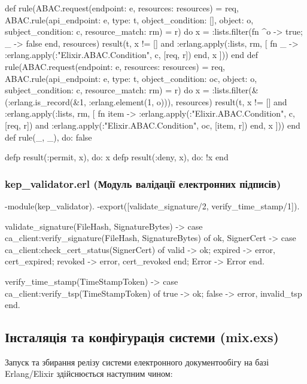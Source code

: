\documentclass{article}
\let\originalfootnotesize\footnotesize
\let\oldverbatim\verbatim
\let\oldendverbatim\endverbatim
\renewenvironment{verbatim}{\originalfootnotesize\oldverbatim}{\oldendverbatim}
\begin{document}
\begin{verbatim}
  def rule(ABAC.request(endpoint: e, resources: resources) = req,
    ABAC.rule(api_endpoint: e, type: t, object_condition: [], object: o,
    subject_condition: c, resource_match: rm) = r) do
    x = :lists.filter(fn ^o -> true; _ -> false end, resources)
    result(t, x != [] and :erlang.apply(:lists, rm, [
      fn _ -> :erlang.apply(:"Elixir.ABAC.Condition", c, [req, r]) end,
      x
    ]))
  end
  def rule(ABAC.request(endpoint: e, resources: resources) = req,
    ABAC.rule(api_endpoint: e, type: t, object_condition: oc, object: o,
    subject_condition: c, resource_match: rm) = r) do
    x = :lists.filter(&(:erlang.is_record(&1, :erlang.element(1, o))), resources)
    result(t, x != [] and :erlang.apply(:lists, rm, [
      fn item -> :erlang.apply(:"Elixir.ABAC.Condition", c, [req, r]) and
        :erlang.apply(:"Elixir.ABAC.Condition", oc, [item, r]) end,
      x
    ]))
  end
  def rule(_, _), do: false

  defp result(:permit, x), do: x
  defp result(:deny, x), do: !x
end
\end{verbatim}
\endgroup

\subsubsection{kep\_validator.erl (Модуль валідації електронних підписів)}

\begingroup
\footnotesize
\begin{verbatim}
-module(kep_validator).
-export([validate_signature/2, verify_time_stamp/1]).

validate_signature(FileHash, SignatureBytes) ->
    case ca_client:verify_signature(FileHash, SignatureBytes) of
        {ok, SignerCert} ->
            case ca_client:check_cert_status(SignerCert) of
                valid -> ok;
                expired -> {error, cert_expired};
                revoked -> {error, cert_revoked}
            end;
        Error -> Error
    end.

verify_time_stamp(TimeStampToken) ->
    case ca_client:verify_tsp(TimeStampToken) of
        true -> ok;
        false -> {error, invalid_tsp}
    end.
\end{verbatim}
\endgroup

\subsection{Інсталяція та конфігурація системи (mix.exs)}
Запуск та збирання релізу системи електронного документообігу на базі Erlang/Elixir здійснюється наступним чином:
\end{document}
